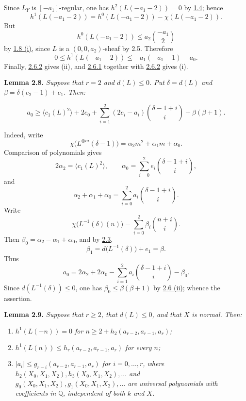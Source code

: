 Since \(L_Y\) is \([-a_1]\)-regular, one has
\(h^2(L(-a_1-2))=0\) by \hyperlink{sga6.e13.prop.1-4}{1.4}; hence
\[
h^1(L(-a_1-2))
=h^0(L(-a_1-2))-\chi(L(-a_1-2)).
\]
But
\[
h^0(L(-a_1-2))\le a_2\binom{-a_1}{2}
\]
by \hyperlink{sga6.e13.prop.1-8}{1.8 (i)}, since \(L\) is a \((0,0,a_2)\)-sheaf by 2.5. Therefore
\begin{equation}
0\le h^1(L(-a_1-2))\le -a_1(-a_1-1)-a_0.
\tag{2.6.2}
\end{equation}
Finally, \hyperlink{sga6.e13.eq.2-6-2}{2.6.2} gives (ii), and \hyperlink{sga6.e13.eq.2-6-1}{2.6.1} together with \hyperlink{sga6.e13.eq.2-6-2}{2.6.2} gives (i).

\textbf{Lemma 2.8.} \emph{Suppose that \(r=2\) and \(d(L)\le0\). Put
\(\delta=d(L)\) and \(\beta=\delta(e_2-1)+e_1\). Then:}

\[
a_0\ge
\bigl\langle c_1(L)^2\bigr\rangle+2e_0
+\sum_{i=1}^{2}(2e_i-a_i)\binom{\delta-1+i}{i}
+\beta(\beta+1).
\]

Indeed, write
\[
\chi\bigl(L^{\otimes m}(\delta-1)\bigr)
=\alpha_2m^2+\alpha_1m+\alpha_0.
\]
Comparison of polynomials gives
\[
2\alpha_2=\bigl\langle c_1(L)^2\bigr\rangle,
\qquad
\alpha_0=\sum_{i=0}^{2}e_i\binom{\delta-1+i}{i},
\]
and
\[
\alpha_2+\alpha_1+\alpha_0
=\sum_{i=0}^{2}a_i\binom{\delta-1+i}{i}.
\]
Write
\[
\chi\bigl(L^{-1}(\delta)(n)\bigr)
=\sum_{i=0}^{2}\beta_i\binom{n+i}{i}.
\]
Then \(\beta_0=\alpha_2-\alpha_1+\alpha_0\), and by \hyperlink{sga6.e13.lem.2-3}{2.3},
\[
\beta_1=d\bigl(L^{-1}(\delta)\bigr)+e_1=\beta.
\]
Thus
\[
a_0=2\alpha_2+2\alpha_0
-\sum_{i=1}^{2}a_i\binom{\delta-1+i}{i}-\beta_0.
\]
Since \(d(L^{-1}(\delta))\le0\), one has
\(\beta_0\le\beta(\beta+1)\) by \hyperlink{sga6.e13.lem.2-6}{2.6 (ii)}; whence the assertion.

\textbf{Lemma 2.9.} \emph{Suppose that \(r\ge2\), that \(d(L)\le0\),
and that \(X\) is normal. Then:}
\begin{enumerate}[label=(\roman*)]
\item \emph{\(h^1(L(-n))=0\) for
\(n\ge2+h_2(a_{r-2},a_{r-1},a_r)\);}
\item \emph{\(h^1(L(n))\le h_r(a_{r-2},a_{r-1},a_r)\) for every
\(n\);}
\item \emph{\(|a_i|\le g_{r-i}(a_{r-2},a_{r-1},a_r)\) for
\(i=0,\ldots,r\), where
\(h_2(X_0,X_1,X_2),h_3(X_0,X_1,X_2),\ldots\) and
\(g_0(X_0,X_1,X_2),g_1(X_0,X_1,X_2),\ldots\) are universal
polynomials with coefficients in \(\mathbb Q\), independent of both
\(k\) and \(X\).}
\end{enumerate}

